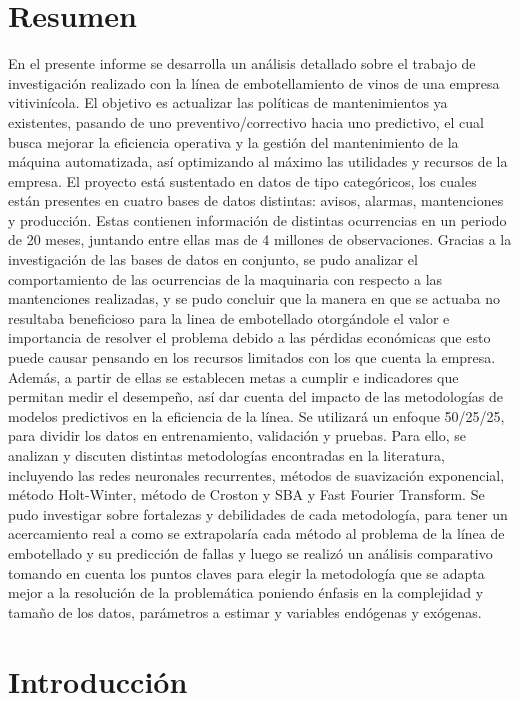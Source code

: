 \documentclass[10pt]{article}
\begin{document}
\newpage
\renewcommand{\contentsname}{Índice}
\tableofcontents
\newpage
\section{Resumen}
En el presente informe se desarrolla un análisis detallado sobre el trabajo de investigación realizado con la línea de embotellamiento de vinos de una empresa vitivinícola. El objetivo es actualizar las políticas de mantenimientos ya existentes, pasando de uno preventivo/correctivo hacia uno predictivo, el cual busca mejorar la eficiencia operativa y la gestión del mantenimiento de la máquina automatizada, así optimizando al máximo las utilidades y recursos de la empresa. El proyecto está sustentado en datos de tipo categóricos, los cuales están presentes en cuatro bases de datos distintas: avisos, alarmas, mantenciones y producción. Estas contienen información de distintas ocurrencias en un periodo de 20 meses, juntando entre ellas mas de 4 millones de observaciones. Gracias a la investigación de las bases de datos en conjunto, se pudo analizar el comportamiento de las ocurrencias de la maquinaria con respecto a las mantenciones realizadas, y se pudo concluir que la manera en que se actuaba no resultaba beneficioso para la linea de embotellado otorgándole el valor e importancia de resolver el problema debido a las pérdidas económicas que esto puede causar pensando en los recursos limitados con los que cuenta la empresa. Además, a partir de ellas se establecen metas a cumplir e indicadores que permitan medir el desempeño, así dar cuenta del impacto de las metodologías de modelos predictivos en la eficiencia de la línea. Se utilizará un enfoque 50/25/25, para dividir los datos en entrenamiento, validación y pruebas. Para ello, se analizan y discuten distintas metodologías encontradas en la literatura, incluyendo las redes neuronales recurrentes, métodos de suavización exponencial, método Holt-Winter, método de Croston y SBA y Fast Fourier Transform. Se pudo investigar sobre fortalezas y debilidades de cada metodología, para tener un acercamiento real a como se extrapolaría cada método al problema de la línea de embotellado y su predicción de fallas y luego se realizó un análisis comparativo tomando en cuenta los puntos claves para elegir la metodología que se adapta mejor a la resolución de la problemática poniendo énfasis en la complejidad y tamaño de los datos, parámetros a estimar y variables endógenas y exógenas. 



\section{Introducción}
\end{document}
